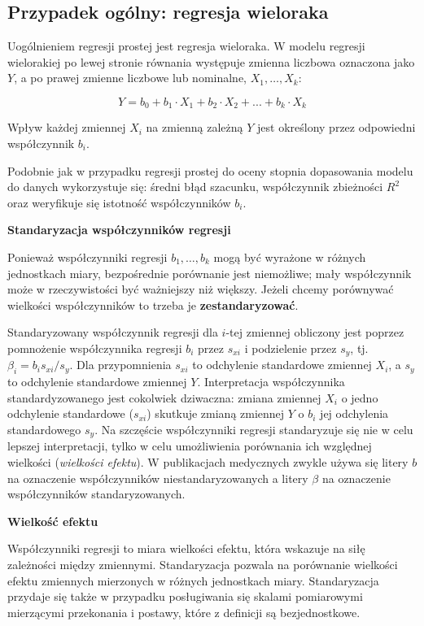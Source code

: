 \documentclass[
  openany]{book}
\begin{document}
\hypertarget{przypadek-oguxf3lny-regresja-wieloraka}{%
\subsection{Przypadek ogólny: regresja wieloraka}\label{przypadek-oguxf3lny-regresja-wieloraka}}

Uogólnieniem regresji prostej jest regresja wieloraka. W modelu
regresji wielorakiej po lewej stronie równania występuje zmienna
liczbowa oznaczona jako \(Y\), a po prawej zmienne liczbowe
lub nominalne, \(X_1, \ldots, X_k\):

\[Y = b_0 + b_1 \cdot X_1 + b_2 \cdot X_2 + ... + b_k \cdot X_k \]

Wpływ każdej
zmiennej \(X_i\) na zmienną zależną \(Y\) jest określony przez odpowiedni współczynnik \(b_i\).

Podobnie jak w przypadku regresji prostej do oceny stopnia dopasowania modelu do danych
wykorzystuje się: średni błąd szacunku, współczynnik zbieżności \(R^2\) oraz
weryfikuje się istotność współczynników \(b_i\).

\textbf{Standaryzacja współczynników regresji}

Ponieważ współczynniki regresji \(b_1, …, b_k\) mogą być wyrażone w różnych jednostkach miary,
bezpośrednie porównanie jest niemożliwe; mały współczynnik może w rzeczywistości być ważniejszy niż większy.
Jeżeli chcemy porównywać wielkości współczynników to trzeba je \textbf{zestandaryzować}.

Standaryzowany współczynnik regresji dla \(i\)-tej zmiennej
obliczony jest poprzez pomnożenie współczynnika regresji \(b_i\) przez \(s_{xi}\)
i podzielenie przez \(s_y\), tj. \(\beta_i = b_i s_{xi}/ s_y\). Dla przypomnienia \(s_{xi}\)
to odchylenie standardowe zmiennej \(X_i\), a \(s_y\) to odchylenie standardowe zmiennej \(Y\).
Interpretacja współczynnika standardyzowanego jest cokolwiek dziwaczna:
zmiana zmiennej \(X_i\) o jedno odchylenie standardowe (\(s_{xi}\))
skutkuje zmianą zmiennej \(Y\) o \(b_i\) jej odchylenia standardowego \(s_y\).
Na szczęście współczynniki regresji standaryzuje się nie w celu lepszej interpretacji,
tylko w celu umożliwienia porównania ich względnej wielkości (\emph{wielkości efektu}).
W publikacjach medycznych zwykle używa się litery \(b\) na oznaczenie współczynników niestandaryzowanych
a litery \(\beta\) na oznaczenie współczynników standaryzowanych.

\textbf{Wielkość efektu}

Współczynniki regresji to miara wielkości efektu, która wskazuje na siłę zależności między zmiennymi.
Standaryzacja pozwala na porównanie wielkości efektu zmiennych mierzonych w różnych jednostkach miary.
Standaryzacja przydaje się także w przypadku posługiwania się skalami pomiarowymi mierzącymi
przekonania i postawy, które z definicji są bezjednostkowe.
\end{document}
